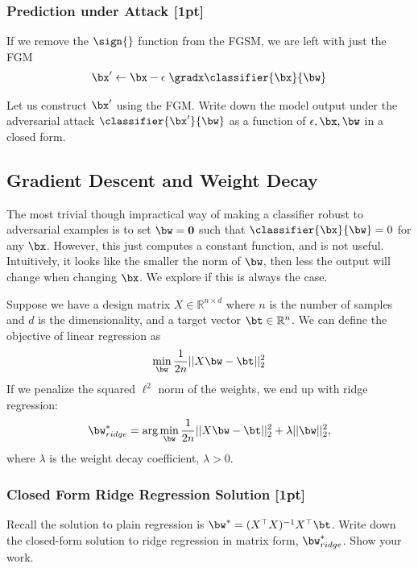 \subsubsection{Prediction under Attack {\color{blue} [1pt]}}
If we remove the $\sign{}$ function from the FGSM, we are left with just the FGM
\begin{align*}
    \bx' \leftarrow \bx - \epsilon \; \gradx \classifier{\bx}{\bw}
\end{align*}

\noindent Let us construct $\bx'$ using the FGM. Write down the model output under the adversarial attack $\classifier{\bx'}{\bw}$ as a function of $\epsilon, \bx, \bw$ in a closed form. \\

\subsection{Gradient Descent and Weight Decay}
The most trivial though impractical way of making a classifier robust to adversarial examples is to set $\bw = \mathbf{0}$ such that $\classifier{\bx}{\bw} = 0$ for any $\bx$. However, this just computes a constant function, and is not useful. Intuitively, it looks like the smaller the norm of $\bw$, then less the output will change when changing $\bx$. We explore if this is always the case. 

Suppose we have a design matrix $X \in \mathbb{R}^{n \times d}$ where $n$ is the number of samples and $d$ is the dimensionality, and a target vector $\bt \in \mathbb{R}^{n}$. We can define the objective of linear regression as
\begin{align*}
    \min_{\bw} \frac{1}{2n}||X\bw - \bt||_{2}^{2}
\end{align*}
\noindent If we penalize the squared $\ell^2$ norm of the weights, we end up with ridge regression:
\begin{align*}
    \bw^*_{ridge} = \arg\min_{\bw} \frac{1}{2n}||X\bw - \bt||_{2}^{2} + \lambda ||\bw||_{2}^{2},
\end{align*}
where $\lambda$ is the weight decay coefficient, $\lambda > 0$. 

\subsubsection{Closed Form Ridge Regression Solution {\color{blue} [1pt]}}
Recall the solution to plain regression is $\bw^{*} = (X^{\top}X)^{-1}X^{\top}\bt$. Write down the closed-form solution to ridge regression in matrix form, $\bw^*_{ridge}$. Show your work.

